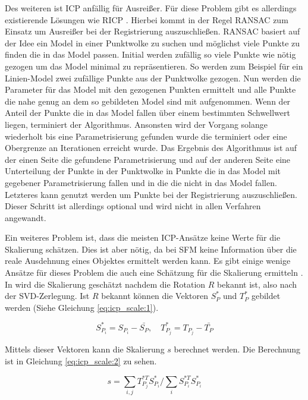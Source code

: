 \documentclass[12pt,titlepage, twoside]{article}
\begin{document}
Des weiteren ist ICP anfällig für Ausreißer. Für diese Problem gibt es allerdings existierende Lösungen wie RICP \cite{ICP}. Hierbei kommt in der Regel RANSAC \cite{RANSAC} zum Einsatz um Ausreißer bei der Registrierung auszuschließen.
RANSAC basiert auf der Idee ein Model in einer Punktwolke zu suchen und möglichst viele Punkte zu finden die in das Model passen. Initial werden zufällig so viele Punkte wie nötig gezogen um das Model minimal zu repräsentieren. 
So werden zum Beispiel für ein Linien-Model zwei zufällige Punkte aus der Punktwolke gezogen. Nun werden die Parameter für das Model mit den gezogenen Punkten ermittelt und alle Punkte die nahe genug an dem so gebildeten Model sind mit aufgenommen.
Wenn der Anteil der Punkte die in das Model fallen über einem bestimmten Schwellwert liegen, terminiert der Algorithmus. 
Ansonsten wird der Vorgang solange wiederholt bis eine Parametrisierung gefunden wurde die terminiert oder eine Obergrenze an Iterationen erreicht wurde.
Das Ergebnis des Algorithmus ist auf der einen Seite die gefundene Parametrisierung und auf der anderen Seite eine Unterteilung der Punkte in der Punktwolke in Punkte die in das Model mit gegebener Parametrisierung fallen und in die die nicht in das Model fallen.
Letzteres kann genutzt werden um Punkte bei der Registrierung auszuschließen. Dieser Schritt ist allerdings optional und wird nicht in allen Verfahren angewandt.

Ein weiteres Problem ist, dass die meisten ICP-Ansätze keine Werte für die Skalierung schätzen. 
Dies ist aber nötig, da bei SFM keine Information über die reale Ausdehnung eines Objektes ermittelt werden kann.
Es gibt einige wenige Ansätze für dieses Problem die auch eine Schätzung für die Skalierung ermitteln \cite{Ziner2005PointSR}.
In \cite{Ziner2005PointSR} wird die Skalierung geschätzt nachdem die Rotation $R$ bekannt ist, also nach der SVD-Zerlegung. 
Ist $R$ bekannt können die Vektoren $S_P^*$ und $T_P^*$ gebildet werden (Siehe Gleichung \ref{eq:icp_scale:1}).

\begin{equation}
    \label{eq:icp_scale:1}
    S_{P_i}^* = S_{P_i} - \bar{S_P},\quad T_{P_j}^* = T_{P_j} - \bar{T_P}
\end{equation}

Mittels dieser Vektoren kann die Skalierung $s$ berechnet werden. Die Berechnung ist in Gleichung \ref{eq:icp_scale:2} zu sehen.

\begin{equation}
    \label{eq:icp_scale:2}
    s = \sum_{i,j}{T_{P_j}^{*T}S_{P_i}^*} / \sum_{i}{S_{P_i}^{*T}S_{P_i}^*}
\end{equation}
\end{document}
